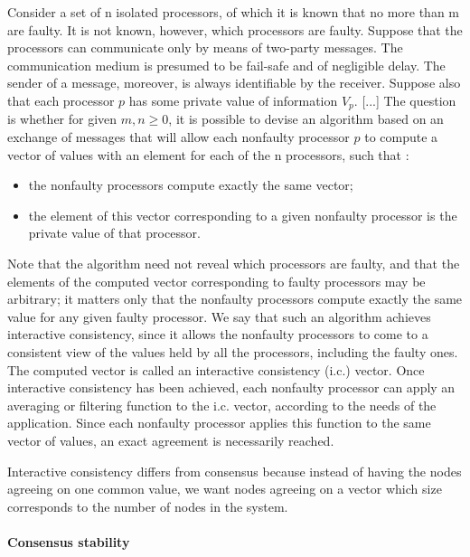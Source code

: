 \documentclass[11pt, twocolumn]{article}
\begin{document}
\begin{displayquote}
    Consider a set of n isolated processors, of which it is known that no more than m are faulty.
    It is not known, however, which processors are faulty. Suppose that the processors can communicate only by means of two-party messages.
    The communication medium is presumed to be fail-safe and of negligible delay. The sender of a message, moreover, is always identifiable by the receiver.
    Suppose also that each processor $p$ has some private value of information \(V_{p}\). [...]
    The question is whether for given \(m, n \geqslant 0 \), it is possible to devise an algorithm based on an exchange of messages that will allow each nonfaulty processor $p$ to compute a vector of values with an element for each of the n processors, such that :

    \begin{itemize}
        \item the nonfaulty processors compute exactly the same vector;
        \item the element of this vector corresponding to a given nonfaulty processor is the private value of that processor.
    \end{itemize}

    Note that the algorithm need not reveal which processors are faulty, and that the elements of the computed vector corresponding to faulty processors may be arbitrary; it matters only that the nonfaulty processors compute exactly the same value for any given faulty processor.
    We say that such an algorithm achieves interactive consistency, since it allows the nonfaulty processors to come to a consistent view of the values held by all the processors, including the faulty ones. The computed vector is called an interactive consistency (i.c.) vector. Once interactive consistency has been achieved, each nonfaulty processor can apply an averaging or filtering function to the i.c. vector, according to the needs of the application.
    Since each nonfaulty processor applies this function to the same vector of values, an exact agreement is necessarily reached.

\end{displayquote}

Interactive consistency differs from consensus because instead of having the nodes agreeing on one common value, we want nodes agreeing on a vector which size corresponds to the number of nodes in the system.

\paragraph{Consensus stability}
\end{document}

